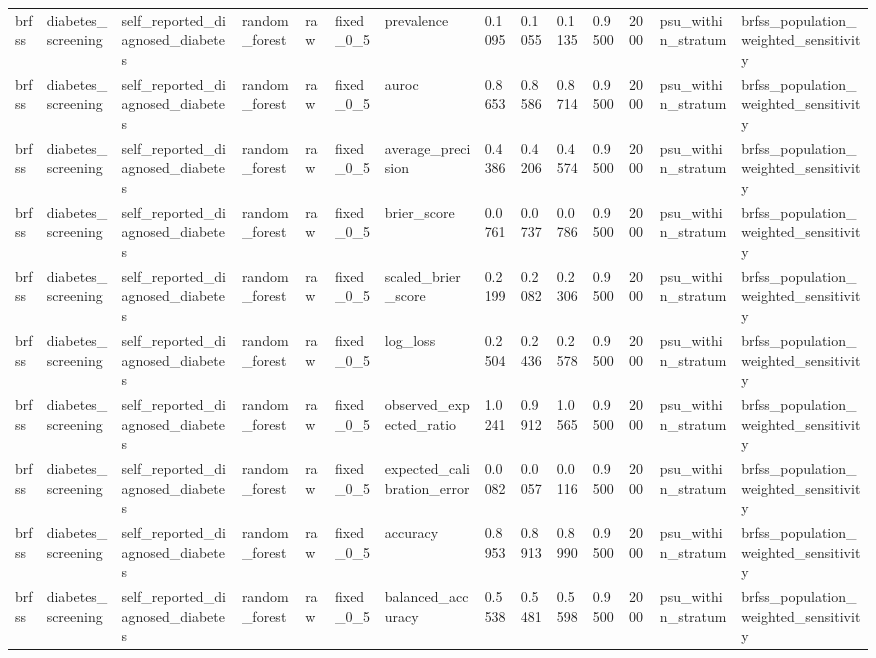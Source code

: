 \begin{tabular}{llllllllllllll}
brfss & diabetes\_screening & self\_reported\_diagnosed\_diabetes & random\_forest & raw & fixed\_0\_5 & prevalence & 0.1095 & 0.1055 & 0.1135 & 0.9500 & 2000 & psu\_within\_stratum & brfss\_population\_weighted\_sensitivity \\
brfss & diabetes\_screening & self\_reported\_diagnosed\_diabetes & random\_forest & raw & fixed\_0\_5 & auroc & 0.8653 & 0.8586 & 0.8714 & 0.9500 & 2000 & psu\_within\_stratum & brfss\_population\_weighted\_sensitivity \\
brfss & diabetes\_screening & self\_reported\_diagnosed\_diabetes & random\_forest & raw & fixed\_0\_5 & average\_precision & 0.4386 & 0.4206 & 0.4574 & 0.9500 & 2000 & psu\_within\_stratum & brfss\_population\_weighted\_sensitivity \\
brfss & diabetes\_screening & self\_reported\_diagnosed\_diabetes & random\_forest & raw & fixed\_0\_5 & brier\_score & 0.0761 & 0.0737 & 0.0786 & 0.9500 & 2000 & psu\_within\_stratum & brfss\_population\_weighted\_sensitivity \\
brfss & diabetes\_screening & self\_reported\_diagnosed\_diabetes & random\_forest & raw & fixed\_0\_5 & scaled\_brier\_score & 0.2199 & 0.2082 & 0.2306 & 0.9500 & 2000 & psu\_within\_stratum & brfss\_population\_weighted\_sensitivity \\
brfss & diabetes\_screening & self\_reported\_diagnosed\_diabetes & random\_forest & raw & fixed\_0\_5 & log\_loss & 0.2504 & 0.2436 & 0.2578 & 0.9500 & 2000 & psu\_within\_stratum & brfss\_population\_weighted\_sensitivity \\
brfss & diabetes\_screening & self\_reported\_diagnosed\_diabetes & random\_forest & raw & fixed\_0\_5 & observed\_expected\_ratio & 1.0241 & 0.9912 & 1.0565 & 0.9500 & 2000 & psu\_within\_stratum & brfss\_population\_weighted\_sensitivity \\
brfss & diabetes\_screening & self\_reported\_diagnosed\_diabetes & random\_forest & raw & fixed\_0\_5 & expected\_calibration\_error & 0.0082 & 0.0057 & 0.0116 & 0.9500 & 2000 & psu\_within\_stratum & brfss\_population\_weighted\_sensitivity \\
brfss & diabetes\_screening & self\_reported\_diagnosed\_diabetes & random\_forest & raw & fixed\_0\_5 & accuracy & 0.8953 & 0.8913 & 0.8990 & 0.9500 & 2000 & psu\_within\_stratum & brfss\_population\_weighted\_sensitivity \\
brfss & diabetes\_screening & self\_reported\_diagnosed\_diabetes & random\_forest & raw & fixed\_0\_5 & balanced\_accuracy & 0.5538 & 0.5481 & 0.5598 & 0.9500 & 2000 & psu\_within\_stratum & brfss\_population\_weighted\_sensitivity \\

\end{tabular}
